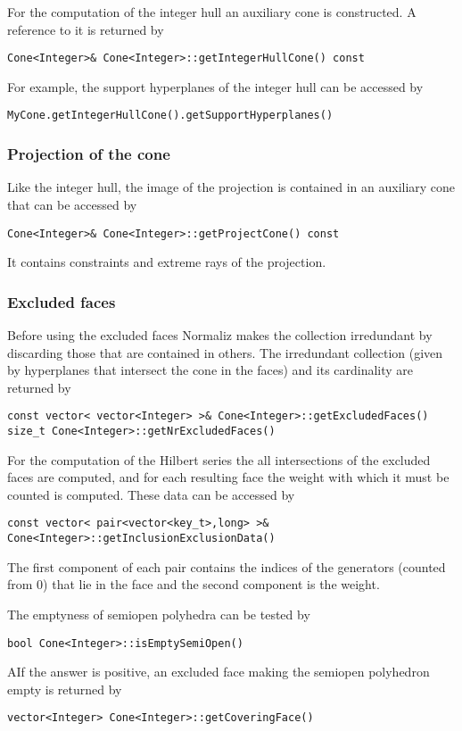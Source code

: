 \documentclass[12pt,a4paper]{scrartcl}
\theoremstyle{definition}
\begin{document}
\begin{small}
For the computation of the integer hull an auxiliary cone is constructed. A reference to it is returned by
\begin{Verbatim}
Cone<Integer>& Cone<Integer>::getIntegerHullCone() const
\end{Verbatim}

For example, the support hyperplanes of the integer hull can be accessed by
\begin{Verbatim}
MyCone.getIntegerHullCone().getSupportHyperplanes()
\end{Verbatim}

\subsubsection{Projection of the cone}

Like the integer hull, the image of the projection is contained in an auxiliary cone that can be accessed by
\begin{Verbatim}
Cone<Integer>& Cone<Integer>::getProjectCone() const
\end{Verbatim}

It contains constraints and extreme rays of the projection.

\subsubsection{Excluded faces}

Before using the excluded faces Normaliz makes the collection irredundant by discarding those that are contained in others. The irredundant collection (given by hyperplanes that intersect the cone in the faces) and its cardinality are returned by
\begin{Verbatim}
const vector< vector<Integer> >& Cone<Integer>::getExcludedFaces()
size_t Cone<Integer>::getNrExcludedFaces()
\end{Verbatim}
For the computation of the Hilbert series the all intersections of the excluded faces are computed, and for each resulting face the weight with which it must be counted is computed. These data can be accessed by 
\begin{Verbatim}
const vector< pair<vector<key_t>,long> >& Cone<Integer>::getInclusionExclusionData()
\end{Verbatim}
The first component of each pair contains the indices of the generators (counted from 0) that lie in the face and the second component is the weight.

The emptyness of semiopen polyhedra can be tested  by
\begin{Verbatim}
bool Cone<Integer>::isEmptySemiOpen()
\end{Verbatim}
AIf the answer is positive, an excluded face making the semiopen polyhedron empty is returned by
\begin{Verbatim}
vector<Integer> Cone<Integer>::getCoveringFace() 
\end{Verbatim}


\end{small}
\end{document}
